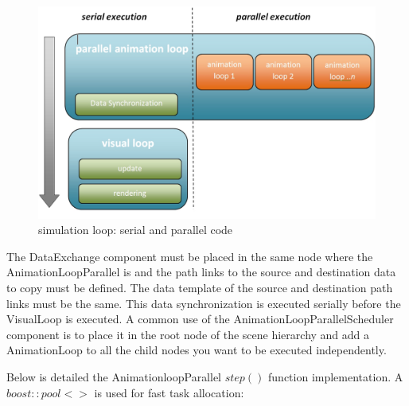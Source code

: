 \documentclass{article}
\begin{document}
\begin{figure}[!h]
	\centering
	\includegraphics[width=1.0\textwidth]{images/multithreading.jpg}
	\caption{simulation loop: serial and parallel code}
	\label{fig:multithreading}
\end{figure}


The DataExchange component must be placed in the same node where the AnimationLoopParallel is and the path links to the source and destination data to copy must be defined.
The data template of the source and destination path links must be the same.
This data synchronization is executed serially before the VisualLoop is executed.
A common use of the AnimationLoopParallelScheduler component is to place it in the root node of the scene hierarchy and add a AnimationLoop to all the child nodes you want to be executed independently.

Below is detailed the AnimationloopParallel $step()$ function implementation. 
A $boost::pool<>$ is used for fast task allocation:
\end{document}
